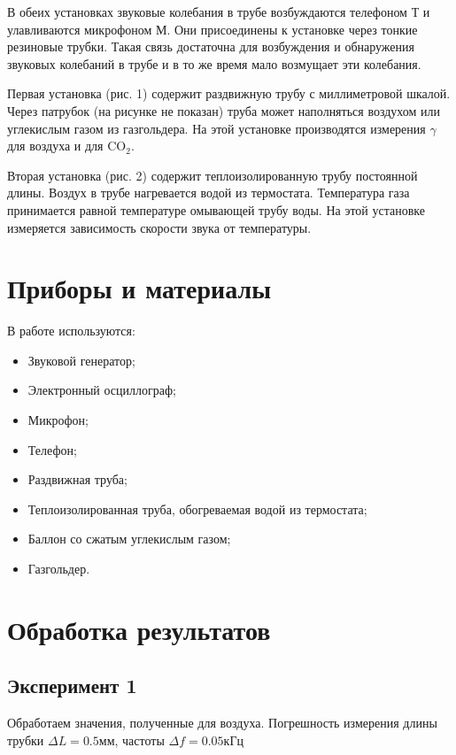 \documentclass[12pt]{article}
\begin{document}
В обеих установках звуковые колебания в трубе возбуждаются телефоном Т и улавливаются микрофоном М. Они присоединены к установке через тонкие резиновые трубки. Такая связь достаточна для возбуждения и обнаружения звуковых колебаний в трубе и в то же время мало возмущает эти колебания.

Первая установка (рис. 1) содержит раздвижную трубу с миллиметровой шкалой. Через патрубок (на рисунке не показан) труба может наполняться воздухом или углекислым газом из газгольдера. На этой установке производятся измерения $\gamma$ для воздуха и для CO$_2$.


Вторая установка (рис. 2) содержит теплоизолированную трубу постоянной длины. Воздух в трубе нагревается водой из термостата. Температура газа принимается равной температуре омывающей трубу воды. На этой установке измеряется зависимость скорости звука от температуры.

\section{Приборы и материалы}

В работе используются:

\begin{itemize}
	\item Звуковой генератор;
	\item Электронный осциллограф;
	\item Микрофон;
	\item Телефон;
	\item Раздвижная труба;
	\item Теплоизолированная труба, обогреваемая водой из термостата;
	\item Баллон со сжатым углекислым газом;
	\item Газгольдер.
\end{itemize}

\section{Обработка результатов}

\subsection{Эксперимент 1}

Обработаем значения, полученные для воздуха. Погрешность измерения длины трубки $\Delta L = 0.5$мм, частоты $\Delta f = 0.05$кГц
\end{document}
